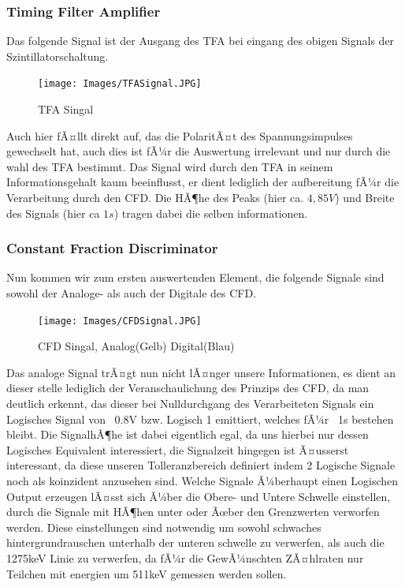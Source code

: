 \documentclass{article}
\begin{document}
            \subsubsection{Timing Filter Amplifier}
                Das folgende Signal ist der Ausgang des TFA bei eingang des obigen Signals der Szintillatorschaltung.
                \begin{figure}[H]
                    \centering
                    \texttt{[image: Images/TFASignal.JPG]}
                    \caption{TFA Singal}
                \end{figure}
                Auch hier fÃ¤llt direkt auf, das die PolaritÃ¤t des Spannungsimpulses gewechselt hat, auch dies ist fÃ¼r die Auswertung irrelevant und
                nur durch die wahl des TFA bestimmt. \newline
                Das Signal wird durch den TFA in seinem Informationsgehalt kaum beeinflusst, er dient lediglich der aufbereitung fÃ¼r
                die Verarbeitung durch den CFD. Die HÃ¶he des Peaks (hier ca. $4,85V$) und Breite des Signals (hier ca $1s$) tragen dabei die selben
                informationen.

            \subsubsection{Constant Fraction Discriminator}
                Nun kommen wir zum ersten auswertenden Element, die folgende Signale sind sowohl der Analoge- als auch der Digitale des CFD.
                \begin{figure}[H]
                    \centering
                    \texttt{[image: Images/CFDSignal.JPG]}
                    \caption{CFD Singal, Analog(Gelb) Digital(Blau)}
                \end{figure}
                Das analoge Signal trÃ¤gt nun nicht lÃ¤nger unsere Informationen, es dient an dieser stelle lediglich der Veranschaulichung des
                Prinzips des CFD, da man deutlich erkennt, das dieser bei Nulldurchgang des Verarbeiteten Signals ein Logisches Signal
                von ~0.8V bzw. Logisch 1 emittiert, welches fÃ¼r ~1s bestehen bleibt. Die SignalhÃ¶he ist dabei eigentlich egal, da uns hierbei nur
                dessen Logisches Equivalent interessiert, die Signalzeit hingegen ist Ã¤usserst interessant, da diese unseren Tolleranzbereich definiert
                indem 2 Logische Signale noch als koinzident anzusehen sind. Welche Signale Ã¼berhaupt einen Logischen Output erzeugen lÃ¤sst sich Ã¼ber
                die Obere- und Untere Schwelle einstellen, durch die Signale mit HÃ¶hen unter oder Ãœber den Grenzwerten verworfen werden. Diese einstellungen
                sind notwendig um sowohl schwaches hintergrundrauschen unterhalb der unteren schwelle zu verwerfen, als auch die 1275keV Linie zu verwerfen,
                da fÃ¼r die GewÃ¼nschten ZÃ¤hlraten nur Teilchen mit energien um 511keV gemessen werden sollen.
\end{document}
